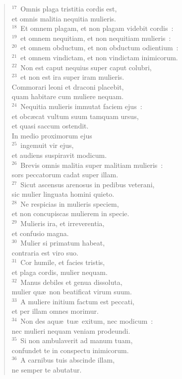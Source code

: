 \begin{verse}${}^{17}$~Omnis plaga tristitia cordis est,\\ et omnis malitia nequitia mulieris.\\
${}^{18}$~Et omnem plagam, et non plagam videbit cordis~:\\
${}^{19}$~et omnem nequitiam, et non nequitiam mulieris~:\\
${}^{20}$~et omnem obductum, et non obductum odientium~:\\
${}^{21}$~et omnem vindictam, et non vindictam inimicorum.\\
${}^{22}$~Non est caput nequius super caput colubri,\\
${}^{23}$~et non est ira super iram mulieris.\\ Commorari leoni et draconi placebit,\\ quam habitare cum muliere nequam.\\
${}^{24}$~Nequitia mulieris immutat faciem ejus~:\\ et obc\ae cat vultum suum tamquam ursus,\\ et quasi saccum ostendit.\\ In medio proximorum ejus\\
${}^{25}$~ingemuit vir ejus,\\ et audiens suspiravit modicum.\\
${}^{26}$~Brevis omnis malitia super malitiam mulieris~:\\ sors peccatorum cadat super illam.\\
${}^{27}$~Sicut ascensus arenosus in pedibus veterani,\\ sic mulier linguata homini quieto.\\
${}^{28}$~Ne respicias in mulieris speciem,\\ et non concupiscas mulierem in specie.\\
${}^{29}$~Mulieris ira, et irreverentia,\\ et confusio magna.\\
${}^{30}$~Mulier si primatum habeat,\\ contraria est viro suo.\\
${}^{31}$~Cor humile, et facies tristis,\\ et plaga cordis, mulier nequam.\\
${}^{32}$~Manus debiles et genua dissoluta,\\ mulier qu\ae\ non beatificat virum suum.\\
${}^{33}$~A muliere initium factum est peccati,\\ et per illam omnes morimur.\\
${}^{34}$~Non des aqu\ae\ tu\ae\ exitum, nec modicum~:\\ nec mulieri nequam veniam prodeundi.\\
${}^{35}$~Si non ambulaverit ad manum tuam,\\ confundet te in conspectu inimicorum.\\
${}^{36}$~A carnibus tuis abscinde illam,\\ ne semper te abutatur.\end{verse}


